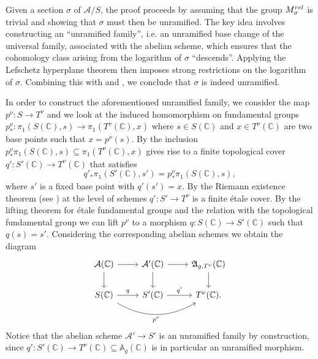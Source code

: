\documentclass[10 pt,a4paper]{article}
\theoremstyle{plain}
\theoremstyle{definition}
\newtheorem{rem}[thm]{Remark}
\theoremstyle{named}
\newcommand{\bA}{\mathbb A}
\newcommand{\cA}{\mathcal A}
\newcommand{\fA}{\mathfrak A}
\newcommand{\bC}{\mathbb C}
\begin{document}

Given a section $\sigma$ of $\cA/S$, the proof proceeds by assuming that the group $M_{\sigma}^{\textnormal{rel}}$ is trivial and showing that $\sigma$ must then be unramified. The key idea involves constructing an ``unramified family'', i.e. an unramified base change of the universal family, associated with the abelian scheme, which ensures that the cohomology class arising from the logarithm of $\sigma$ ``descends''. Applying the Lefschetz hyperplane theorem then imposes strong restrictions on the logarithm of $\sigma$. Combining this with  and , we conclude that $\sigma$ is indeed unramified.





In order to construct the aforementioned unramified family, we consider the  map $p^\nu:S \to T^\nu$ and we look at the induced homomorphism on fundamental groups $p^\nu_*:\pi_1(S(\bC),s) \to \pi_1(T^\nu(\bC),x)$ where $s \in S(\bC)$ and $x \in T^\nu(\bC)$ are two base points such that $x=p^\nu(s)$. By \cite[Corollary 12.19]{Lee2} the inclusion $p^\nu_*\pi_1(S(\bC),s) \subseteq \pi_1(T^\nu(\bC),x)$ gives rise to a finite topological cover $q': S'(\bC) \to T^\nu(\bC)$ that  satisfies
\begin{equation}\label{liftProp}
q'_*\pi_1(S'(\bC),s')=p^\nu_*\pi_1(S(\bC),s),
\end{equation}
where $s'$ is a fixed base point with $q'(s')=x$. By the Riemann existence theorem  (see \cite[Exposé XII, Théorème~5.1]{SGA1}) at the level of schemes $q':S'\to T^\nu$ is a finite \'etale cover. By the lifting theorem for \'etale fundamental groups and the relation with the topological fundamental group we can lift $p^\nu$ to a morphism $q:S(\bC)\rightarrow S'(\bC)$ such that $q(s)=s'$. Considering the corresponding abelian schemes we obtain the diagram
\begin{equation}\label{factorScheme}
	\begin{tikzcd}
		\cA(\bC) \arrow{d} \arrow{r} & \cA'(\bC) \arrow{d} \arrow{r} & \fA_{g,T^\nu}(\bC) \arrow{d}\\
		S(\bC) \arrow{r}{q} \arrow[bend right, swap]{rr}{p^\nu}& S'(\bC) \arrow{r}{q'} & T^\nu(\bC).
	\end{tikzcd}
\end{equation}
Notice that the abelian scheme $\cA' \to S'$ is an unramified family by construction, since $q':S'(\bC) \to T^\nu(\bC) \subseteq \bA_g(\bC)$ is in particular an unramified morphism.
\end{document}
